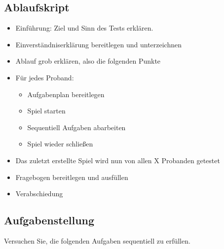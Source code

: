	\subsection{Ablaufskript}
	\begin{itemize}
	\item Einführung: Ziel und Sinn des Tests erklären.

	\item Einverständniserklärung bereitlegen und unterzeichnen

	\item Ablauf grob erklären, also die folgenden Punkte

	\item Für jedes Proband:
	\begin{itemize}
	\item Aufgabenplan bereitlegen

	\item Spiel starten

	\item Sequentiell Aufgaben abarbeiten

	\item Spiel wieder schließen
	\end{itemize}

	\item Das zuletzt erstellte Spiel wird nun von allen X Probanden getestet

	\item Fragebogen bereitlegen und ausfüllen

	\item Verabschiedung
	\end{itemize}  
	
	\subsection{Aufgabenstellung}
Versuchen Sie, die folgenden Aufgaben sequentiell zu erfüllen.

